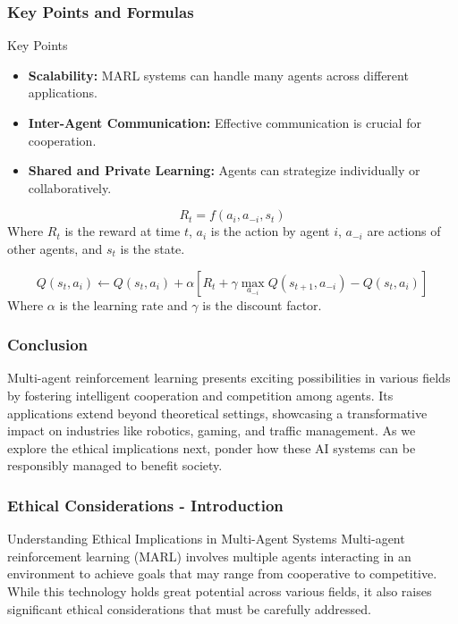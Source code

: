 \documentclass[aspectratio=169]{beamer}
\begin{document}
\begin{frame}[fragile]
    \frametitle{Key Points and Formulas}
    \begin{block}{Key Points}
        \begin{itemize}
            \item \textbf{Scalability:} MARL systems can handle many agents across different applications.
            \item \textbf{Inter-Agent Communication:} Effective communication is crucial for cooperation.
            \item \textbf{Shared and Private Learning:} Agents can strategize individually or collaboratively.
        \end{itemize}
    \end{block}

    \begin{equation}
        R_t = f(a_i, a_{-i}, s_t)
    \end{equation}
    Where \( R_t \) is the reward at time \( t \), \( a_i \) is the action by agent \( i \), \( a_{-i} \) are actions of other agents, and \( s_t \) is the state.

    \begin{equation}
        Q(s_t, a_i) \leftarrow Q(s_t, a_i) + \alpha [R_t + \gamma \max_{a_{-i}}Q(s_{t+1}, a_{-i}) - Q(s_t, a_i)]
    \end{equation}
    Where \( \alpha \) is the learning rate and \( \gamma \) is the discount factor.
\end{frame}

\begin{frame}[fragile]
    \frametitle{Conclusion}
    Multi-agent reinforcement learning presents exciting possibilities in various fields by fostering intelligent cooperation and competition among agents. Its applications extend beyond theoretical settings, showcasing a transformative impact on industries like robotics, gaming, and traffic management. As we explore the ethical implications next, ponder how these AI systems can be responsibly managed to benefit society.
\end{frame}

\begin{frame}[fragile]
    \frametitle{Ethical Considerations - Introduction}
    \begin{block}{Understanding Ethical Implications in Multi-Agent Systems}
        Multi-agent reinforcement learning (MARL) involves multiple agents interacting in an environment to achieve goals that may range from cooperative to competitive. 
        While this technology holds great potential across various fields, it also raises significant ethical considerations that must be carefully addressed.
    \end{block}
\end{frame}
\end{document}
